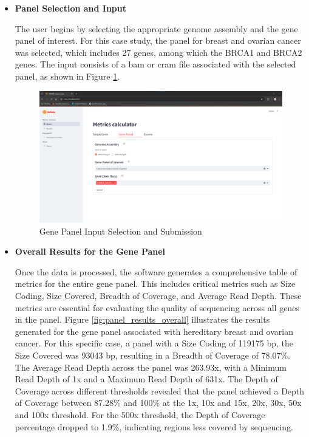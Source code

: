 \begin{itemize}
\item \textbf{Panel Selection and Input}

The user begins by selecting the appropriate genome assembly and the gene panel of interest. For this case study, the panel for breast and ovarian cancer was selected, which includes 27 genes, among which the BRCA1 and BRCA2 genes. The input consists of a \ac{bam} or \ac{cram} file associated with the selected panel, as shown in Figure \ref{fig:panel_input}.

\begin{figure}[H]
    \centering
    \includegraphics[width=\textwidth]{figs/v3.8.png}
    \caption{Gene Panel Input Selection and Submission}
    \label{fig:panel_input}
\end{figure}

\item \textbf{Overall Results for the Gene Panel}

Once the data is processed, the software generates a comprehensive table of metrics for the entire gene panel. This includes critical metrics such as Size Coding, Size Covered, Breadth of Coverage, and Average Read Depth. These metrics are essential for evaluating the quality of sequencing across all genes in the panel. Figure \ref{fig:panel_results_overall} illustrates the results generated for the gene panel associated with hereditary breast and ovarian cancer. For this specific case, a panel with a Size Coding of 119175 \ac{bp}, the Size Covered was 93043 \ac{bp}, resulting in a Breadth of Coverage of 78.07\%. The Average Read Depth across the panel was 263.93x, with a Minimum Read Depth of 1x and a Maximum Read Depth of 631x. The Depth of Coverage across different thresholds revealed that the panel achieved a Depth of Coverage between 87.28\% and 100\% at the 1x, 10x and 15x, 20x, 30x, 50x and 100x threshold. For the 500x threshold, the Depth of Coverage percentage dropped to 1.9\%, indicating regions less covered by sequencing. 


\end{itemize}
